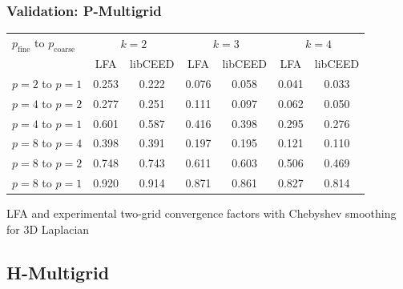 \documentclass{beamer}
\begin{document}
\begin{frame}
\begin{center}
\frametitle{Validation: P-Multigrid}

\begin{table}[ht!]
\begin{center}
\begin{tabular}{l cc cc cc}
  \toprule
  $p_{\text{fine}}$ to $p_{\text{coarse}}$  &  \multicolumn{2}{c}{$k = 2$}  &  \multicolumn{2}{c}{$k = 3$}  &  \multicolumn{2}{c}{$k = 4$}  \\
                      &  LFA  &  libCEED  &  LFA  &  libCEED  &  LFA  &  libCEED  \\
  \toprule
  $p = 2$ to $p = 1$  &  0.253 & 0.222  &  0.076 & 0.058  &  0.041 & 0.033  \\
  \midrule
  $p = 4$ to $p = 2$  &  0.277 & 0.251  &  0.111 & 0.097  &  0.062 & 0.050  \\
  $p = 4$ to $p = 1$  &  0.601 & 0.587  &  0.416 & 0.398  &  0.295 & 0.276  \\
  \midrule
  $p = 8$ to $p = 4$  &  0.398 & 0.391  &  0.197 & 0.195  &  0.121 & 0.110  \\
  $p = 8$ to $p = 2$  &  0.748 & 0.743  &  0.611 & 0.603  &  0.506 & 0.469  \\
  $p = 8$ to $p = 1$  &  0.920 & 0.914  &  0.871 & 0.861  &  0.827 & 0.814  \\
  \bottomrule
\end{tabular}
\end{center}
\label{table:two_grid_3d_chebyshev}
\end{table}

LFA and experimental two-grid convergence factors with Chebyshev smoothing for 3D Laplacian\\

\end{center}
\end{frame}


\subsection{H-Multigrid}
\end{document}
